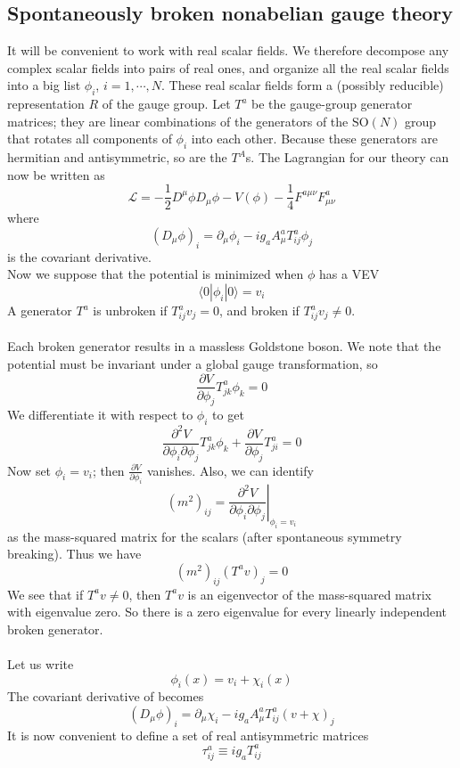 \subsection{Spontaneously broken nonabelian gauge theory}
It will be convenient to work with real scalar fields. We
therefore decompose any complex scalar fields into pairs of real ones, and organize all the real scalar fields into a big list $\phi_i$, $i = 1,\cdots,N$. 
These real scalar fields form a (possibly reducible) representation $R$ of the gauge group. Let $T^a$ be the gauge-group generator matrices; they are linear combinations of the generators of the $\mathrm{SO}(N)$ group that rotates all components of $\phi_i$ into each other. Because these generators are hermitian and antisymmetric, so are the  $T^A$s. The Lagrangian for our theory can now be written as
\[\mathcal{L} = -\frac{1}{2}D^{\mu}\phi D_{\mu}\phi - V(\phi) - \frac{1}{4}F^{a\mu\nu}F^a_{\mu\nu}\]
where
\[(D_{\mu}\phi)_i = \partial_{\mu}\phi_i - ig_aA^a_{\mu}T^a_{ij}\phi_j\]
is the covariant derivative.
\\
Now we suppose that the potential is minimized when $\phi$ has a VEV
\[\langle 0 | \phi_i | 0 \rangle = v_i\]
A generator $T^a$ is unbroken if $T^a_{ij}v_j = 0$, and broken if $T^a_{ij}v_j \neq 0$.
\\ \\
Each broken generator results in a massless Goldstone boson. We note that the potential must be invariant under a global gauge transformation, so
\[\frac{\partial V}{\partial \phi_j} T^a_{jk}\phi_k = 0\]
We differentiate it with respect to $\phi_i$ to get
\[\frac{\partial^2 V}{\partial \phi_i \partial \phi_j} T^a_{jk}\phi_k + \frac{\partial V}{\partial \phi_j} T^a_{ji} = 0 \]
Now set $\phi_i = v_i$; then $\frac{\partial V}{\partial \phi_i}$ vanishes. Also, we can identify
\[(m^2)_{ij} = \left. \frac{\partial^2 V}{\partial \phi_i \partial \phi_j} \right|_{\phi_i = v_i}\]
as the mass-squared matrix for the scalars (after spontaneous symmetry breaking). Thus we have
\[(m^2)_{ij} (T^av)_j = 0\]
We see that if $T^av \neq 0$, then $T^av$ is an eigenvector of the mass-squared matrix with eigenvalue zero. So there is a zero eigenvalue for every linearly independent broken generator.
\\ \\
Let us write
\[\phi_i(x) = v_i + \chi_i(x)\]
The covariant derivative of becomes
\[(D_{\mu}\phi)_i = \partial_{\mu}\chi_i - ig_aA^a_{\mu}T^a_{ij}(v+\chi)_j\]
It is now convenient to define a set of real antisymmetric matrices
\[\tau^a_{ij} \equiv ig_aT^a_{ij}\]
